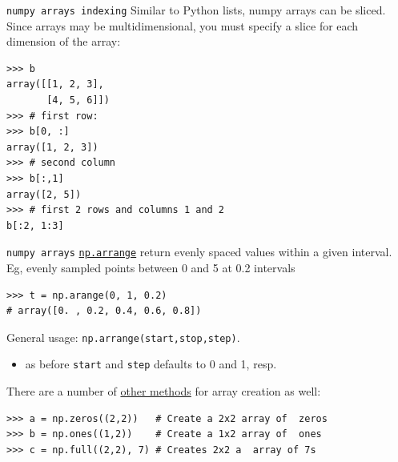 \documentclass[xcolor=svgnames]{beamer}
\newcommand{\nl}{\\[1em]}
\begin{document}
\begin{frame}[fragile]{\tt numpy arrays indexing}
Similar to Python lists, numpy arrays can be sliced. Since arrays may be multidimensional, you must specify a slice for each dimension of the array:
\begin{Verbatim}[frame=single]
>>> b
array([[1, 2, 3],
       [4, 5, 6]])
>>> # first row:
>>> b[0, :]
array([1, 2, 3])
>>> # second column
>>> b[:,1]
array([2, 5])
>>> # first 2 rows and columns 1 and 2
b[:2, 1:3]
\end{Verbatim}

\end{frame}




\begin{frame}[fragile]{\tt numpy arrays}
\href{https://docs.scipy.org/doc/numpy/reference/generated/numpy.arange.html\#numpy.arange}{\tt np.arrange} return evenly spaced values within a given interval.  Eg, evenly sampled points between 0 and 5 at 0.2 intervals
\begin{Verbatim}[frame=single]
>>> t = np.arange(0, 1, 0.2)
# array([0. , 0.2, 0.4, 0.6, 0.8])
\end{Verbatim}
General usage: {\tt np.arrange(start,stop,step)}.
\begin{itemize}
\item  as before {\tt start} and {\tt step} defaults to 0 and 1, resp.\nl
\end{itemize}


There are a number of  \href{https://docs.scipy.org/doc/numpy/user/basics.creation.html\#arrays-creation}{other methods} for array creation as well:
\begin{Verbatim}
>>> a = np.zeros((2,2))   # Create a 2x2 array of  zeros
>>> b = np.ones((1,2))    # Create a 1x2 array of  ones
>>> c = np.full((2,2), 7) # Creates 2x2 a  array of 7s
\end{Verbatim}

\end{frame}
\end{document}
